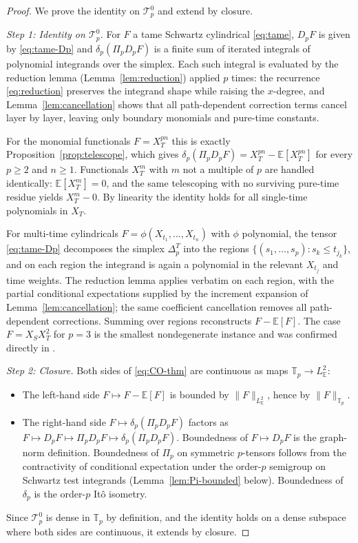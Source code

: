 \documentclass[11pt,reqno]{amsart}
\theoremstyle{plain}
\theoremstyle{definition}
\newcommand{\E}{\mathbb{E}}
\newcommand{\simplex}{\Delta_p^T}
\begin{document}
\begin{proof}
We prove the identity on $\mathcal{T}_p^0$ and extend by closure.

\emph{Step 1: Identity on $\mathcal{T}_p^0$.} For $F$ a tame Schwartz cylindrical \eqref{eq:tame}, $D_p F$ is given by \eqref{eq:tame-Dp} and $\delta_p(\Pi_p D_p F)$ is a finite sum of iterated integrals of polynomial integrands over the simplex. Each such integral is evaluated by the reduction lemma (Lemma~\ref{lem:reduction}) applied $p$ times: the recurrence \eqref{eq:reduction} preserves the integrand shape while raising the $x$-degree, and Lemma~\ref{lem:cancellation} shows that all path-dependent correction terms cancel layer by layer, leaving only boundary monomials and pure-time constants.

For the monomial functionals $F = X_T^{pn}$ this is exactly Proposition~\ref{prop:telescope}, which gives $\delta_p(\Pi_p D_p F) = X_T^{pn} - \E[X_T^{pn}]$ for every $p \geq 2$ and $n \geq 1$. Functionals $X_T^{m}$ with $m$ not a multiple of $p$ are handled identically: $\E[X_T^m]=0$, and the same telescoping with no surviving pure-time residue yields $X_T^m - 0$. By linearity the identity holds for all single-time polynomials in $X_T$.

For multi-time cylindricals $F = \phi(X_{t_1}, \ldots, X_{t_n})$ with $\phi$ polynomial, the tensor \eqref{eq:tame-Dp} decomposes the simplex $\simplex$ into the regions $\{(s_1, \ldots, s_p) : s_k \leq t_{j_k}\}$, and on each region the integrand is again a polynomial in the relevant $X_{t_j}$ and time weights. The reduction lemma applies verbatim on each region, with the partial conditional expectations supplied by the increment expansion of Lemma~\ref{lem:cancellation}; the same coefficient cancellation removes all path-dependent corrections. Summing over regions reconstructs $F - \E[F]$. The case $F = X_S X_T^2$ for $p=3$ is the smallest nondegenerate instance and was confirmed directly in \cite[\S 4.2]{operatorDerivativeII}.

\emph{Step 2: Closure.} Both sides of \eqref{eq:CO-thm} are continuous as maps $\mathbb{T}_p \to L^2_\E$:
\begin{itemize}
\item The left-hand side $F \mapsto F - \E[F]$ is bounded by $\|F\|_{L^2_\E}$, hence by $\|F\|_{\mathbb{T}_p}$.
\item The right-hand side $F \mapsto \delta_p(\Pi_p D_p F)$ factors as $F \mapsto D_p F \mapsto \Pi_p D_p F \mapsto \delta_p(\Pi_p D_p F)$. Boundedness of $F \mapsto D_p F$ is the graph-norm definition. Boundedness of $\Pi_p$ on symmetric $p$-tensors follows from the contractivity of conditional expectation under the order-$p$ semigroup on Schwartz test integrands (Lemma~\ref{lem:Pi-bounded} below). Boundedness of $\delta_p$ is the order-$p$ Itô isometry.
\end{itemize}
Since $\mathcal{T}_p^0$ is dense in $\mathbb{T}_p$ by definition, and the identity holds on a dense subspace where both sides are continuous, it extends by closure.


\end{proof}
\end{document}
